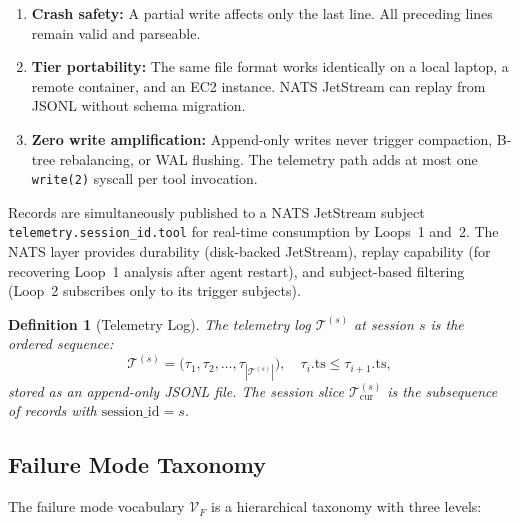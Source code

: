 \documentclass[11pt]{article}
\newtheorem{definition}{Definition}
\begin{document}
\begin{enumerate}[leftmargin=1.5em]
    \item \textbf{Crash safety:} A partial write affects only the last line.
          All preceding lines remain valid and parseable.
    \item \textbf{Tier portability:} The same file format works identically
          on a local laptop, a remote container, and an EC2 instance. NATS
          JetStream can replay from JSONL without schema migration.
    \item \textbf{Zero write amplification:} Append-only writes never
          trigger compaction, B-tree rebalancing, or WAL flushing. The
          telemetry path adds at most one \texttt{write(2)} syscall per
          tool invocation.
\end{enumerate}

Records are simultaneously published to a NATS JetStream subject
\texttt{telemetry.{session\_id}.{tool}} for real-time consumption by Loops~1
and~2. The NATS layer provides durability (disk-backed JetStream), replay
capability (for recovering Loop~1 analysis after agent restart), and
subject-based filtering (Loop~2 subscribes only to its trigger subjects).

\begin{definition}[Telemetry Log]
\label{def:telemetry_log}
The telemetry log $\mathcal{T}^{(s)}$ at session $s$ is the ordered sequence:
\begin{equation}
\mathcal{T}^{(s)} = \bigl( \tau_1, \tau_2, \ldots, \tau_{|\mathcal{T}^{(s)}|} \bigr),
\quad \tau_i.\text{ts} \leq \tau_{i+1}.\text{ts},
\end{equation}
stored as an append-only JSONL file. The \emph{session slice}
$\mathcal{T}^{(s)}_{\text{cur}}$ is the subsequence of records with
$\text{session\_id} = s$.
\end{definition}

\subsection{Failure Mode Taxonomy}

The failure mode vocabulary $\mathcal{V}_F$ is a hierarchical taxonomy with
three levels:
\end{document}
